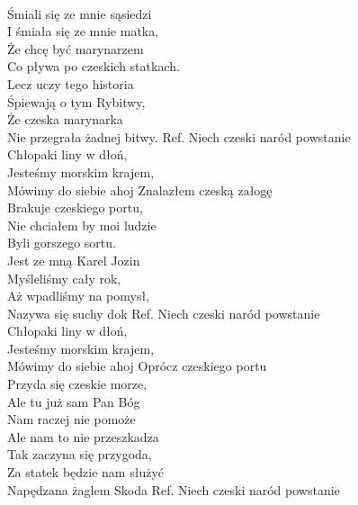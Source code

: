 \tab{}\tab{}\\
Śmiali się ze mnie sąsiedzi \tab{}\\
I śmiała się ze mnie matka, \tab{}\\
Że chcę być marynarzem \tab{}\\
Co pływa po czeskich statkach. \\
Lecz uczy tego historia\\
Śpiewają o tym Rybitwy,\\
Że czeska marynarka\\
Nie przegrała żadnej bitwy.
\hops
Ref. Niech czeski naród powstanie \\
 Chłopaki liny w dłoń, \tab{}\\
 Jesteśmy morskim krajem, \\
 Mówimy do siebie ahoj \tab{}
\hops
Znalazłem czeską załogę\\
Brakuje czeskiego portu,\\
Nie chciałem by moi ludzie\\
Byli gorszego sortu.\\
Jest ze mną Karel Jozin\\
Myśleliśmy cały rok,\\
Aż wpadliśmy na pomysł,\\
Nazywa się suchy dok
\hops
Ref. Niech czeski naród powstanie \\
 Chłopaki liny w dłoń, \tab{}\\
 Jesteśmy morskim krajem, \\
 Mówimy do siebie ahoj \tab{}
\hops
Oprócz czeskiego portu\\
Przyda się czeskie morze,\\
Ale tu już sam Pan Bóg\\
Nam raczej nie pomoże\\
Ale nam to nie przeszkadza\\
Tak zaczyna się przygoda,\\
Za statek będzie nam służyć\\
Napędzana żaglem Skoda 
\hops
Ref. Niech czeski naród powstanie \\
